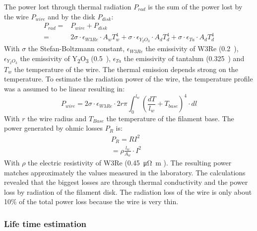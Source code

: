 		The power lost through thermal radiation $P_{rad}$ is the sum of the power lost by the wire $P_{wire}$ and by the disk $P_{disk}$:
		\begin{align}
			P_{rad} =& P_{wire} + P_{disk}\\
					=& 2\sigma\cdot\epsilon_{W3Re}\cdot A_w T_w^4 + \sigma\cdot\epsilon_{Y_2 O_3}\cdot A_d T_d^4 + \sigma\cdot\epsilon_{Ta}\cdot A_d T_d^4
		\end{align}
		With $\sigma$ the Stefan-Boltzmann constant, $\epsilon_{W3Re}$ the emissivity of W3Re (0.2~\cite{thermcondTungst}), $\epsilon_{Y_2 O_3}$ the emissivity of Y\textsubscript{2}O\textsubscript{3} (0.5~\cite{ThermEmiss_Y2O3}), $\epsilon_{Ta}$ the emissivity of tantalum (0.325~\cite{ThermalEmiss_Ta}) and $T_w$ the temperature of the wire. The thermal emission depends strong on the temperature. To estimate the radiation power of the wire, the temperature profile was a assumed to be linear resulting in:
		\begin{equation}
			P_{wire} = 2\sigma\cdot\epsilon_{W3Re}\cdot2r\pi\int_{0}^{l_w} (\frac{dT}{l_w} + T_{base})^4\cdot dl
		\end{equation}
		With $r$ the wire radius and $T_{Base}$ the temperature of the filament base.%
		The power generated by ohmic losses $P_R$ is:
		\begin{align}
			P_R = RI^2&\\
				= \rho\frac{l_w}{A_w}\cdot I^2&
		\end{align}
		With $\rho$ the electric resistivity of W3Re (0.45~\si{\micro\ohm\meter} \cite{thermResistTungst}). The resulting power matches approximately the values measured in the laboratory. The calculations revealed that the biggest losses are through thermal conductivity and the power loss by radiation of the filament disk. The radiation loss of the wire is only about 10\% of the total power loss because the wire is very thin.
		
		
		\subsubsection{Life time estimation}
		
